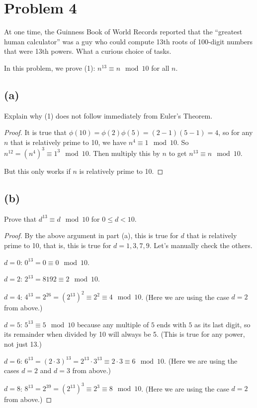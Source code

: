 \documentclass[14pt]{extarticle}
\begin{document}
\section{Problem 4}
At one time, the Guinness Book of World Records reported that the ``greatest human calculator'' was a guy who could compute 13th roots of 100-digit numbers that were 13th powers. What a curious choice of tasks.

In this problem, we prove (1): $n^{13} \equiv n \mod 10$ for all $n$.

\subsection{(a)}
Explain why (1) does not follow immediately from Euler’s Theorem.
\begin{proof}
It is true that $\phi(10) = \phi(2)\phi(5) = (2-1)(5-1) = 4$, so for any $n$ that is relatively prime to 10, we have $n^4 \equiv 1 \mod 10$. So $n^{12} = (n^4)^3 \equiv 1^3 \mod 10$. Then multiply this by $n$ to get $n^{13} \equiv n \mod 10$.

But this only works if $n$ is relatively prime to 10.
\end{proof}

\subsection{(b)}
Prove that $d^{13} \equiv d \mod 10$ for $0 \leq d < 10$.
\begin{proof}
By the above argument in part (a), this is true for $d$ that is relatively prime to 10, that is, this is true for $d = 1, 3, 7, 9$. Let's manually check the others.

$d = 0$: $0^{13} = 0 \equiv 0 \mod 10$.  

$d = 2$: $2^{13} = 8192 \equiv 2 \mod 10$. 

$d = 4$: $4^{13} = 2^{26} = (2^{13})^2 \equiv 2^2 \equiv 4 \mod 10$. (Here we are using the case $d = 2$ from above.) 

$d = 5$: $5^{13} \equiv 5 \mod 10$ because any multiple of $5$ ends with $5$ as its last digit, so its remainder when divided by 10 will always be 5. (This is true for any power, not just 13.)

$d = 6$: $6^{13} = (2\cdot 3)^{13} = 2^{13} \cdot 3^{13} \equiv 2 \cdot 3 \equiv 6 \mod 10$. (Here we are using the cases $d = 2$ and $d = 3$ from above.)

$d = 8$: $8^{13} = 2^{39} = (2^{13})^3 \equiv 2^3 \equiv 8 \mod 10$. (Here we are using the case $d = 2$ from above.) 
\end{proof}
\end{document}
